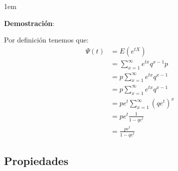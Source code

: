 \documentclass[12pt, fleqn]{report}                             %
\newenvironment{SmallIndentation}[1][0.75em]                    %
        {\begin{adjustwidth}{#1}{}\begin{footnotesize}}             %
        {\end{footnotesize}\end{adjustwidth}}                       %
\theoremstyle{break}                                            %
\newcommand{\Wrap}[1]{\left( #1 \right)}                        %
\begin{document}
                \begin{SmallIndentation}[1em]
                    \textbf{Demostración}:
                    
                    Por definición tenemos que:
                    \begin{align*}
                        \Psi (t) 
                            &= E\Wrap{e^{tX}}                                       \\
                            &= \sum_{x=1}^\infty e^{tx} q^{x-1}p                    \\
                            &= p \sum_{x=1}^\infty e^{tx} q^{x-1}                   \\
                            &= p \sum_{x=1}^\infty e^{tx} q^{x-1}                   \\
                            &= p e^t \sum_{x=1}^\infty (qe^t)^x                     \\
                            &= p e^t \frac{1}{1 - qe^t}                             \\
                            &= \frac{pe^t}{1-qe^t} 
                    \end{align*}
                
                \end{SmallIndentation}
                    

            \clearpage
            \subsection{Propiedades}
\end{document}

